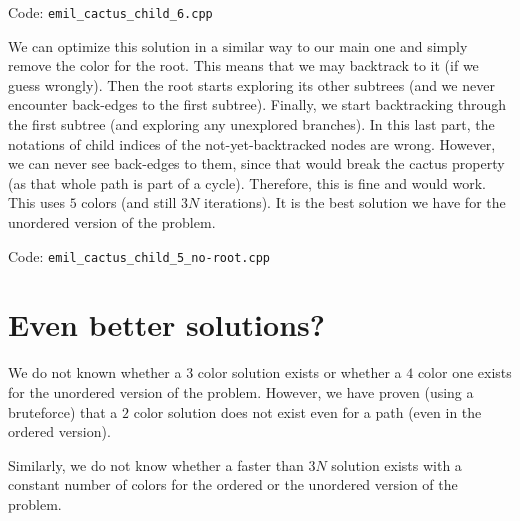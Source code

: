 \documentclass{article}
\begin{document}
Code: \verb|emil_cactus_child_6.cpp|

We can optimize this solution in a similar way to our main one and simply remove the color for the root. This means that we may backtrack to it (if we guess wrongly). Then the root starts exploring its other subtrees (and we never encounter back-edges to the first subtree). Finally, we start backtracking through the first subtree (and exploring any unexplored branches). In this last part, the notations of child indices of the not-yet-backtracked nodes are wrong. However, we can never see back-edges to them, since that would break the cactus property (as that whole path is part of a cycle). Therefore, this is fine and would work. This uses $5$ colors (and still $3N$ iterations). It is the best solution we have for the unordered version of the problem.

Code: \verb|emil_cactus_child_5_no-root.cpp|


\section{Even better solutions?}

We do not known whether a $3$ color solution exists or whether a $4$ color one exists for the unordered version of the problem. However, we have proven (using a bruteforce) that a $2$ color solution does not exist even for a path (even in the ordered version).

Similarly, we do not know whether a faster than $3N$ solution exists with a constant number of colors for the ordered or the unordered version of the problem.
\end{document}
